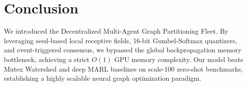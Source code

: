\documentclass[10pt]{article}
\begin{document}
\section{Conclusion}
We introduced the Decentralized Multi-Agent Graph Partitioning Fleet. By leveraging seed-based local receptive fields, 16-bit Gumbel-Softmax quantizers, and event-triggered consensus, we bypassed the global backpropagation memory bottleneck, achieving a strict $O(1)$ GPU memory complexity. Our model beats Mutex Watershed and deep MARL baselines on scale-100 zero-shot benchmarks, establishing a highly scalable neural graph optimization paradigm.



\end{document}
